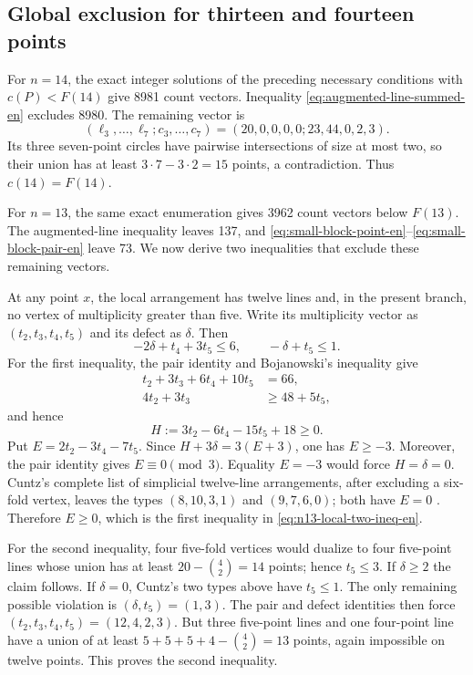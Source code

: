 \documentclass[11pt,a4paper]{article}
\theoremstyle{definition}
\begin{document}
\subsection{Global exclusion for thirteen and fourteen points}

For $n=14$, the exact integer solutions of the preceding necessary
conditions with $c(P)<F(14)$ give 8981 count vectors.  Inequality
\eqref{eq:augmented-line-summed-en} excludes 8980.  The remaining vector is
\[
 (\ell_3,\ldots,\ell_7;c_3,\ldots,c_7)
 =(20,0,0,0,0;23,44,0,2,3).
\]
Its three seven-point circles have pairwise intersections of size at most two,
so their union has at least $3\cdot7-3\cdot2=15$ points, a contradiction.
Thus $c(14)=F(14)$.

For $n=13$, the same exact enumeration gives 3962 count vectors below $F(13)$.
The augmented-line inequality leaves 137, and
\eqref{eq:small-block-point-en}--\eqref{eq:small-block-pair-en} leave 73.  We
now derive two inequalities that exclude these remaining vectors.

At any point $x$, the local arrangement has twelve lines and, in the present
branch, no vertex of multiplicity greater than five.  Write its multiplicity
vector as $(t_2,t_3,t_4,t_5)$ and its defect as $\delta$.  Then
\begin{equation}\label{eq:n13-local-two-ineq-en}
 -2\delta+t_4+3t_5\le6,
 \qquad -\delta+t_5\le1.
\end{equation}
For the first inequality, the pair identity and Bojanowski's inequality give
\begin{align*}
 t_2+3t_3+6t_4+10t_5&=66,\\
 4t_2+3t_3&\ge48+5t_5,
\end{align*}
and hence
\[
 H:=3t_2-6t_4-15t_5+18\ge0.
\]
Put $E=2t_2-3t_4-7t_5$.  Since
$H+3\delta=3(E+3)$, one has $E\ge-3$.  Moreover, the pair identity gives
$E\equiv0\pmod3$.  Equality $E=-3$ would force $H=\delta=0$.
Cuntz's complete list of simplicial twelve-line arrangements, after excluding
a six-fold vertex, leaves the types $(8,10,3,1)$ and $(9,7,6,0)$; both have
$E=0$ \cite[Theorem~1.1 and the invariant tables]{cuntz-en}.  Therefore
$E\ge0$, which is the first inequality in \eqref{eq:n13-local-two-ineq-en}.

For the second inequality, four five-fold vertices would dualize to four
five-point lines whose union has at least $20-\binom42=14$ points; hence
$t_5\le3$.  If $\delta\ge2$ the claim follows.  If $\delta=0$, Cuntz's two
types above have $t_5\le1$.  The only remaining possible violation is
$(\delta,t_5)=(1,3)$.  The pair and defect identities then force
$(t_2,t_3,t_4,t_5)=(12,4,2,3)$.  But three five-point lines and one
four-point line have a union of at least $5+5+5+4-\binom42=13$ points, again
impossible on twelve points.  This proves the second inequality.
\end{document}
